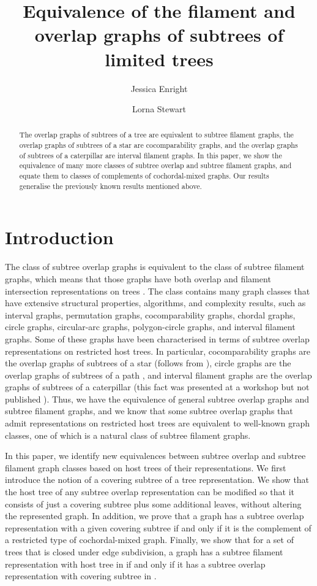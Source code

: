 \documentclass[
final
]{dmtcs-episciences}        \usepackage{graphics, amsthm, amsmath, amssymb, algorithm, algorithmic}
\author{Jessica Enright\affiliationmark{1}
	\and Lorna Stewart\affiliationmark{2}}
\title{Equivalence of the filament and overlap graphs of subtrees of limited trees}
\affiliation{
University of Stirling, Stirling, Scotland, UK\\
	University of Alberta, Edmonton, Alberta, Canada}
\begin{document}

\maketitle

\begin{abstract}
The overlap graphs of subtrees of a tree are equivalent to subtree filament graphs, the overlap graphs of subtrees of a star are cocomparability graphs, and the overlap graphs of subtrees of a caterpillar are interval filament graphs. In this paper, we show the equivalence of many more classes of subtree overlap and subtree filament graphs, and equate them to classes of complements of cochordal-mixed graphs. 
Our results generalise the previously known results mentioned above.
\end{abstract}

\section{Introduction}\label{intro}
The class of subtree overlap graphs is equivalent to the class of subtree filament graphs, which means that those graphs have both overlap and filament intersection representations on trees \cite{Jess}.
The class contains many graph classes that have extensive structural properties, algorithms, and complexity results, such as interval graphs, permutation graphs, cocomparability graphs, chordal graphs, circle graphs, circular-arc graphs, polygon-circle graphs, and interval filament graphs.  
Some of these graphs have been characterised in terms of subtree overlap representations on restricted host trees. In particular, cocomparability graphs are the overlap graphs of subtrees of a star (follows from \cite{GolSch}), circle graphs are the overlap graphs of subtrees of a path \cite{gavril1973}, and interval filament graphs are the overlap graphs of subtrees of a caterpillar (this fact was presented at a workshop but not published \cite{CGO}).
Thus, we have the equivalence of general subtree overlap graphs and subtree filament graphs, and we know that some subtree overlap graphs that admit representations on restricted host trees are equivalent to well-known graph classes, one of which is a natural class of subtree filament graphs.

In this paper, we identify new equivalences between subtree overlap and subtree filament graph classes based on host trees of their representations.
We first introduce the notion of a covering subtree of a tree representation. We show that the host tree of any subtree overlap representation can be modified so that it consists of just a covering subtree plus some additional leaves, without altering the represented graph.
In addition, we prove that a graph has a subtree overlap representation with a given covering subtree if and only if it is the complement of a restricted type of cochordal-mixed graph. 
Finally, we show that for a set  of trees that is closed under edge subdivision, a graph has a subtree filament representation with host tree in  if and only if it has a subtree overlap representation with covering subtree in . 
\end{document}
